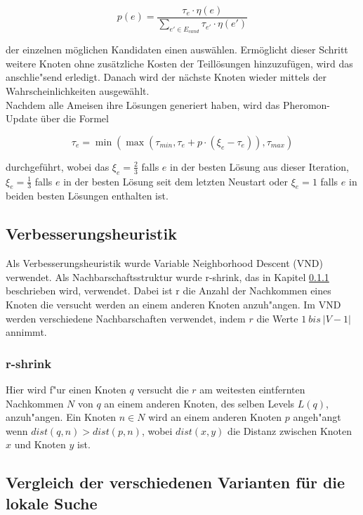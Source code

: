 \documentclass[a4paper,10pt]{article}
\begin{document}
\begin{displaymath} 
p(e) = \frac{\tau_{e} \cdot \eta(e)}{\sum_{e' \in E_{cand}} \tau_{e'} \cdot \eta(e')}
\end{displaymath}

der einzelnen m\"{o}glichen Kandidaten einen ausw\"{a}hlen. Erm\"{o}glicht dieser Schritt weitere Knoten ohne zus\"{a}tzliche Kosten der Teill\"{o}sungen hinzuzuf\"{u}gen, wird das anschlie"send erledigt. Danach wird der n\"{a}chste Knoten wieder mittels der Wahrscheinlichkeiten ausgew\"{a}hlt.\\
Nachdem alle Ameisen ihre L\"{o}sungen generiert haben, wird das Pheromon-Update \"{u}ber die Formel
 
\begin{displaymath} 
\tau_{e} = \min(\max(\tau_{min},\tau_{e} + p \cdot (\xi_e - \tau_{e})),\tau_{max})
\end{displaymath}

durchgef\"{u}hrt, wobei das $\xi_e=\frac{2}{3}$ falls $e$ in der besten L\"{o}sung aus dieser Iteration, $\xi_e=\frac{1}{3}$ falls
$e$ in der besten L\"{o}sung seit dem letzten Neustart oder $\xi_e=1$ falls $e$ in beiden besten L\"{o}sungen enthalten ist.

\subsection{Verbesserungsheuristik}
Als Verbesserungsheuristik wurde Variable Neighborhood Descent (VND) verwendet. Als Nachbarschaftsstruktur wurde r-shrink, das in Kapitel \ref{sec:shrink} beschrieben wird, verwendet. Dabei ist r die Anzahl der Nachkommen eines Knoten die versucht werden an einem anderen Knoten anzuh"angen. Im VND werden verschiedene Nachbarschaften verwendet, indem $r$ die Werte $1\ bis\ |V-1|$ annimmt.

\subsubsection{r-shrink}
\label{sec:shrink}
Hier wird f"ur einen Knoten $q$ versucht die $r$ am weitesten eintfernten Nachkommen $N$ von $q$ an einem anderen Knoten, des selben Levels $L(q)$, anzuh"angen. Ein Knoten $n \in N$ wird an einem anderen Knoten $p$ angeh"angt wenn $dist(q,n) > dist(p,n)$, wobei $dist(x,y)$ die Distanz zwischen Knoten $x$ und Knoten $y$ ist. 

\subsection{Vergleich der verschiedenen Varianten f\"{u}r die lokale Suche}
\end{document}
